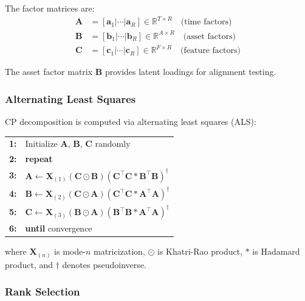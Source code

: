 \documentclass[11pt,twocolumn]{article}
\begin{document}
The factor matrices are:
\begin{align}
\mathbf{A} &= [\mathbf{a}_1 | \cdots | \mathbf{a}_R] \in \mathbb{R}^{T \times R} \quad \text{(time factors)} \\
\mathbf{B} &= [\mathbf{b}_1 | \cdots | \mathbf{b}_R] \in \mathbb{R}^{A \times R} \quad \text{(asset factors)} \\
\mathbf{C} &= [\mathbf{c}_1 | \cdots | \mathbf{c}_R] \in \mathbb{R}^{F \times R} \quad \text{(feature factors)}
\end{align}

The asset factor matrix $\mathbf{B}$ provides latent loadings for alignment testing.

\subsubsection{Alternating Least Squares}

CP decomposition is computed via alternating least squares (ALS):

\begin{tcolorbox}[colback=gray!5,colframe=farzullaburgundy,title={\textbf{Algorithm 1:} CP-ALS}]
\begin{tabular}{@{}ll@{}}
\textbf{1:} & Initialize $\mathbf{A}$, $\mathbf{B}$, $\mathbf{C}$ randomly \\
\textbf{2:} & \textbf{repeat} \\
\textbf{3:} & \quad $\mathbf{A} \gets \mathbf{X}_{(1)} (\mathbf{C} \odot \mathbf{B}) (\mathbf{C}^\top\mathbf{C} * \mathbf{B}^\top\mathbf{B})^{\dagger}$ \\
\textbf{4:} & \quad $\mathbf{B} \gets \mathbf{X}_{(2)} (\mathbf{C} \odot \mathbf{A}) (\mathbf{C}^\top\mathbf{C} * \mathbf{A}^\top\mathbf{A})^{\dagger}$ \\
\textbf{5:} & \quad $\mathbf{C} \gets \mathbf{X}_{(3)} (\mathbf{B} \odot \mathbf{A}) (\mathbf{B}^\top\mathbf{B} * \mathbf{A}^\top\mathbf{A})^{\dagger}$ \\
\textbf{6:} & \textbf{until} convergence
\end{tabular}
\end{tcolorbox}

where $\mathbf{X}_{(n)}$ is mode-$n$ matricization, $\odot$ is Khatri-Rao product, $*$ is Hadamard product, and $\dagger$ denotes pseudoinverse.

\subsubsection{Rank Selection}
\end{document}
